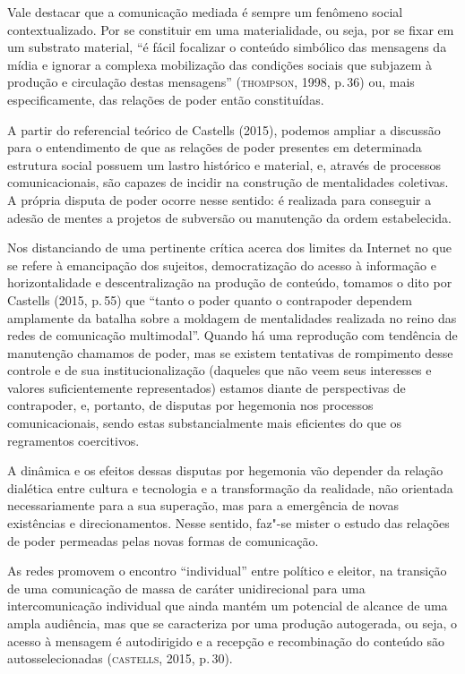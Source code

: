 Vale destacar que a comunicação mediada é sempre um fenômeno social
contextualizado. Por se constituir em uma materialidade, ou seja, por se
fixar em um substrato material, ``é fácil focalizar o conteúdo simbólico
das mensagens da mídia e ignorar a complexa mobilização das condições
sociais que subjazem à produção e circulação destas mensagens''
(\textsc{thompson}, 1998, p.\,36) ou, mais especificamente, das relações de poder
então constituídas.

A partir do referencial teórico de Castells (2015), podemos ampliar a
discussão para o entendimento de que as relações de poder presentes em
determinada estrutura social possuem um lastro histórico e material, e,
através de processos comunicacionais, são capazes de incidir na
construção de mentalidades coletivas. A própria disputa de poder ocorre
nesse sentido: é realizada para conseguir a adesão de mentes a projetos
de subversão ou manutenção da ordem estabelecida.

Nos distanciando de uma pertinente crítica acerca dos limites da
Internet no que se refere à emancipação dos sujeitos, democratização do
acesso à informação e horizontalidade e descentralização na produção de
conteúdo, tomamos o dito por Castells (2015, p.\,55) que ``tanto o poder
quanto o contrapoder dependem amplamente da batalha sobre a moldagem de
mentalidades realizada no reino das redes de comunicação multimodal''.
Quando há uma reprodução com tendência de manutenção chamamos de poder,
mas se existem tentativas de rompimento desse controle e de sua
institucionalização (daqueles que não veem seus interesses e valores
suficientemente representados) estamos diante de perspectivas de
contrapoder, e, portanto, de disputas por hegemonia nos processos
comunicacionais, sendo estas substancialmente mais eficientes do que os
regramentos coercitivos.

A dinâmica e os efeitos dessas disputas por hegemonia vão depender da
relação dialética entre cultura e tecnologia e a transformação da
realidade, não orientada necessariamente para a sua superação, mas para
a emergência de novas existências e direcionamentos. Nesse sentido,
faz"-se mister o estudo das relações de poder permeadas pelas novas
formas de comunicação.

As redes promovem o encontro ``individual'' entre político e eleitor, na
transição de uma comunicação de massa de caráter unidirecional para uma
intercomunicação individual que ainda mantém um potencial de alcance de
uma ampla audiência, mas que se caracteriza por uma produção autogerada,
ou seja, o acesso à mensagem é autodirigido e a recepção e recombinação
do conteúdo são autosselecionadas (\textsc{castells}, 2015, p.\,30).

